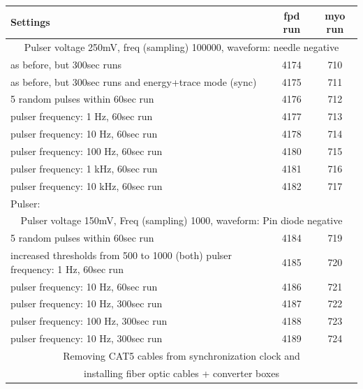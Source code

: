   \begin{table}
  \centering
  	\begin{tabularx}{0.9 \textwidth}{|X|cc|}
  	\hline
  		\bf{Settings} & \bf{fpd run} & \bf{myo run}\\	
  		\hline
  		\multicolumn{3}{|c|}{Pulser voltage 250mV, freq (sampling) 100000, waveform: needle negative}\\
  		\hline
		as before, but 300sec runs & 4174 & 710 \\
		as before, but 300sec runs and energy+trace mode (sync) & 4175 & 711 \\
		5 random pulses within 60sec run & 4176 & 712 \\
		pulser frequency: 1 Hz, 60sec run & 4177 & 713 \\
		pulser frequency: 10 Hz, 60sec run & 4178 & 714 \\
		pulser frequency: 100 Hz, 60sec run & 4180 & 715 \\
		pulser frequency: 1 kHz, 60sec run & 4181 & 716 \\
		pulser frequency: 10 kHz, 60sec run & 4182 & 717 \\
		Pulser:&&\\
		\hline
		\multicolumn{3}{|c|}{Pulser voltage 150mV, Freq (sampling) 1000, waveform: Pin diode negative}\\
		\hline
		5 random pulses within 60sec run & 4184 & 719 \\
		increased thresholds from 500 to 1000 (both)
		pulser frequency: 1 Hz, 60sec run & 4185 & 720 \\
		pulser frequency: 10 Hz, 60sec run & 4186 & 721 \\
		pulser frequency: 10 Hz, 300sec run & 4187 & 722 \\
		pulser frequency: 100 Hz, 300sec run & 4188 & 723 \\
		pulser frequency: 10 Hz, 300sec run & 4189 & 724 \\
		\hline
		\multicolumn{3}{|c|}{ Removing CAT5 cables from synchronization clock and }\\
		\multicolumn{3}{|c|}{ installing fiber optic cables + converter boxes}\\
		

\end{tabularx}
\end{table}
